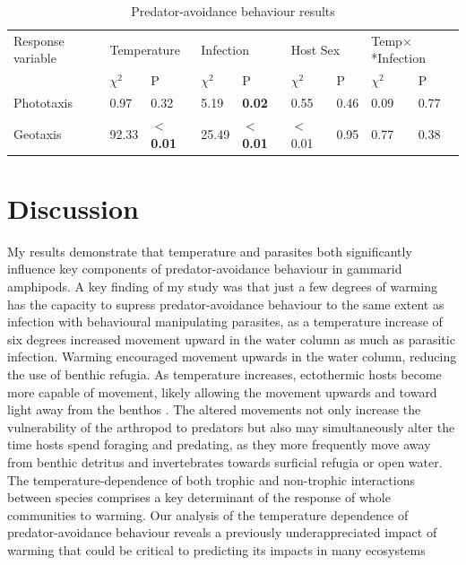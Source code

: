 \begin{table}
\caption[Results of chi-squared analysis of linear mixed-effects models testing the impact of temperature, parasitic infection, and host sex on the geotactic and phototactic behaviour of \emph{Gammarus duebeni}. Significant terms are listed in bold.]{Predator-avoidance behaviour results}
\begin{tabular}{lllllllll}
Response variable & \multicolumn{2}{l}{Temperature} & \multicolumn{2}{l}{Infection} & \multicolumn{2}{l}{Host Sex} & \multicolumn{2}{l}{Temp$\times$*Infection} \\
                  & $\chi^2$         & P                  & $\chi^2$       & P                  & $\chi^2$                 & P       & $\chi^2$               & P               \\
Phototaxis        & 0.97       & 0.32               & 5.19     & \textbf{0.02}               & 0.55               & 0.46    & 0.09             & 0.77            \\
Geotaxis          & 92.33      &\textbf{$<$0.01}     & 25.49    & \textbf{$<$0.01}   & $<$0.01    & 0.95    & 0.77             & 0.38           
\end{tabular}
\label{tab:taxistab}
\end{table}


\section{Discussion}

My results demonstrate that temperature and parasites both significantly influence key components of predator-avoidance behaviour in gammarid amphipods. A key finding of my study was that just a few degrees of warming has the capacity to supress predator-avoidance behaviour to the same extent as infection with behavioural manipulating parasites, as a temperature increase of six degrees increased movement upward in the water column as much as parasitic infection. Warming encouraged movement upwards in the water column, reducing the use of benthic refugia. As temperature increases, ectothermic hosts become more capable of movement, likely allowing the movement upwards and toward light away from the benthos \citep{pawar2016, abram2017}. The altered movements not only increase the vulnerability of the arthropod to predators \citep{perrot2012} but also may simultaneously alter the time hosts spend foraging and predating, as they more frequently move away from benthic detritus and invertebrates towards surficial refugia or open water. The temperature-dependence of both trophic \citep{uszko2017} and non-trophic \citep{kordas2017} interactions between species comprises a key determinant of the response of whole communities to warming. Our analysis of the temperature dependence of predator-avoidance behaviour reveals a previously underappreciated impact of warming that could be critical to predicting its impacts in many ecosystems

